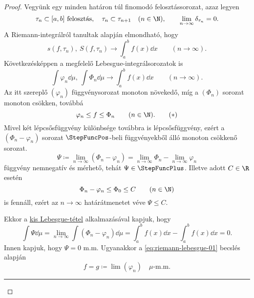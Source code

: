 \documentclass[
]{elteikthesis}[2024/04/26]
\begin{document}
\begin{proof}
		Vegyünk egy minden határon túl finomodó felosztássorozat, azaz legyen
		\[
			\tau_n \subset [a, b] \text{ felosztás}, \quad
			\tau_n \subset \tau_{n + 1} \quad (n \in \N), \qquad
			\lim_{n \to \infty} \delta_{\tau_n} = 0.
		\]
		A Riemann-integrálról tanultak alapján elmondható, hogy
		\[
			s(f, \tau_n), \ S(f, \tau_n) \longrightarrow  \int_a^b f(x) \dd{x}
			\qquad (n \to \infty).
		\]
		Következésképpen a megfelelő Lebesgue-integrálsorozatok is
		\[
			\int \varphi_n \dd{\mu}, \
			\int \Phi_n    \dd{\mu} \longrightarrow  \int_a^b f(x) \dd{x}
			\qquad (n \to \infty).
		\]
		Az itt szereplő \( (\varphi_n) \) függvénysorozat monoton növekedő,
		míg a \( (\Phi_n) \) sorozat monoton csökken, továbbá
		\begin{equation}\label{eq:riemann-lebesgue-01}
			\varphi_n \leq f \leq \Phi_n
			\qquad (n \in \N).
			\tag{\( * \)}
		\end{equation}
		Mivel két lépcsősfüggvény különbsége továbbra is lépcsősfüggvény, 
		ezért a \( (\Phi_n - \varphi_n) \) sorozat \( \StepFuncPos \)-beli függvényekből álló monoton csökkenő sorozat.
		\[
			\Psi \coloneq 
			\lim_{n \to \infty} (\Phi_n - \varphi_n) =
			\lim_{n \to \infty} \Phi_n - \lim_{n \to \infty} \varphi_n
		\]
		függvény nemnegatív és mérhető, tehát \( \Psi \in \StepFuncPlus \). 
		Illetve adott \( C \in \R \) esetén
		\[
			\Phi_n - \varphi_n \leq \Phi_0 \leq C \qquad (n \in \N)
		\]
		is fennáll, 
		ezért az \( n \to \infty \) határátmenetet véve \( \Psi \leq C \).
		
		Ekkor a \hyperref[th:kis-lebesgue]{kis Lebesgue-tétel} alkalmazásával kapjuk, hogy
		\[
			\int \Psi \dd{\mu} =
			\lim_{n \to \infty} \int (\Phi_n - \varphi_n) \dd{\mu} =
			\int_a^b f(x) \dd{x} - \int_a^b f(x) \dd{x} =
			0.
		\]
		Innen kapjuk, hogy \( \Psi = 0 \) m.m.
		Ugyanakkor a \eqref{eq:riemann-lebesgue-01} becslés alapján
		\begin{equation*}\label{eq:riemann-lebesgue-02}
			f = g \coloneq \lim(\varphi_n) \quad \mu \text{-m.m.}
			\tag{\( ** \)}
		\end{equation*}
		
		\vspace{6pt}
		\hrule
		\vspace{9pt}
				

\end{proof}
\end{document}
